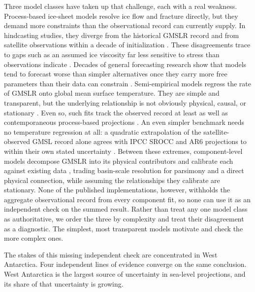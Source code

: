 \documentclass[12pt]{article}
\begin{document}
Three model classes have taken up that challenge, each with a real
weakness. Process-based ice-sheet models resolve ice flow and
fracture directly, but they demand more constraints than the
observational record can currently supply. In hindcasting studies, they
diverge from the historical GMSLR record \citep{Aschwanden2021} and from
satellite observations within a decade of initialization
\citep{Fricker2025}. These disagreements trace to gaps such as an
assumed ice viscosity far less sensitive to stress than observations
indicate \citep{Millstein2022,GetraerMorlighem2025}. Decades of general
forecasting research show that models tend to forecast worse than
simpler alternatives once they carry more free parameters than their
data can constrain \citep{Green2015,Makridakis2020}. Semi-empirical
models regress the rate of GMSLR onto global mean surface temperature.
They are simple and transparent, but the underlying relationship is not
obviously physical, causal, or stationary
\citep{Rahmstorf2007,Vermeer2009,Church2013}. Even so, such fits track
the observed record at least as well as contemporaneous process-based
projections \citep{Rahmstorf2012}. An even simpler benchmark needs no
temperature regression at all: a quadratic extrapolation of the
satellite-observed GMSL record alone agrees with IPCC SROCC and AR6
projections to within their own stated uncertainty \citep{Nerem2022}.
Between these extremes,
component-level models decompose GMSLR into its physical contributors
and calibrate each against existing data
\citep{Kopp2014,Mengel2016,Wong2017}, trading basin-scale resolution for
parsimony and a direct physical connection, while assuming the
relationships they calibrate are stationary. None of the published
implementations, however, withholds the aggregate observational record
from every component fit, so none can use it as an independent check on
the summed result. Rather than treat any one model class as
authoritative, we order the three by complexity and treat their
disagreement as a diagnostic. The simplest, most transparent models
motivate and check the more complex ones.

The stakes of this missing independent check are concentrated in West
Antarctica. Four independent lines of evidence converge on the same
conclusion. West Antarctica is the largest source of uncertainty in
sea-level projections, and its share of that uncertainty is growing.
\end{document}
